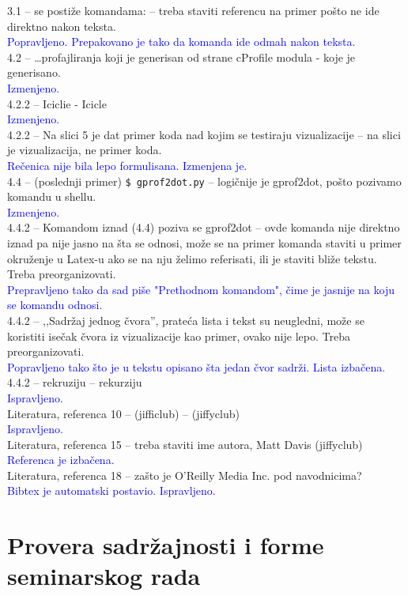 \documentclass[a4paper]{report}
\newcommand{\odgovor}[1]{\textcolor{blue}{#1}}
\begin{document}
3.1 -- se postiže komandama: -- treba staviti referencu na primer pošto ne ide direktno nakon teksta.\\
\odgovor{Popravljeno. Prepakovano je tako da komanda ide odmah nakon teksta.}\\
4.2 -- \ldots{}profajliranja koji je generisan od strane cProfile modula - koje je generisano.\\
\odgovor{Izmenjeno.}\\
4.2.2 -- Iciclie - Icicle\\
\odgovor{Izmenjeno.}\\
4.2.2 -- Na slici 5 je dat primer koda nad kojim se testiraju vizualizacije -- na slici je vizualizacija, ne primer koda.\\
\odgovor{Rečenica nije bila lepo formulisana. Izmenjena je.}\\
4.4 -- (poslednji primer) \verb|$ gprof2dot.py| -- logičnije je gprof2dot, pošto pozivamo komandu u shellu.\\
\odgovor{Izmenjeno.}\\
4.4.2 -- Komandom iznad (4.4) poziva se gprof2dot -- ovde komanda nije direktno iznad pa nije jasno na šta se odnosi, može se na primer komanda staviti u primer okruženje u Latex-u ako se na nju želimo referisati, ili je staviti bliže tekstu. Treba preorganizovati.\\
\odgovor{Prepravljeno tako da sad piše "Prethodnom komandom", čime je jasnije na koju se komandu odnosi.}\\
4.4.2 -- ,,Sadržaj jednog čvora'', prateća lista i tekst su neugledni, može se koristiti isečak čvora iz vizualizacije kao primer, ovako nije lepo. Treba preorganizovati.\\
\odgovor{Popravljeno tako što je u tekstu opisano šta jedan čvor sadrži. Lista izbačena.}\\
4.4.2 -- rekruziju -- rekurziju\\
\odgovor{Ispravljeno.}\\
Literatura, referenca 10 -- (jifficlub) -- (jiffyclub)\\
\odgovor{Ispravljeno.}\\
Literatura, referenca 15 -- treba staviti ime autora, Matt Davis (jiffyclub)\\
\odgovor{Referenca je izbačena.}\\
Literatura, referenca 18 -- zašto je O'Reilly Media Inc. pod navodnicima?\\
\odgovor{Bibtex je automatski postavio. Ispravljeno.}\\
\section{Provera sadržajnosti i forme seminarskog rada}
\end{document}
